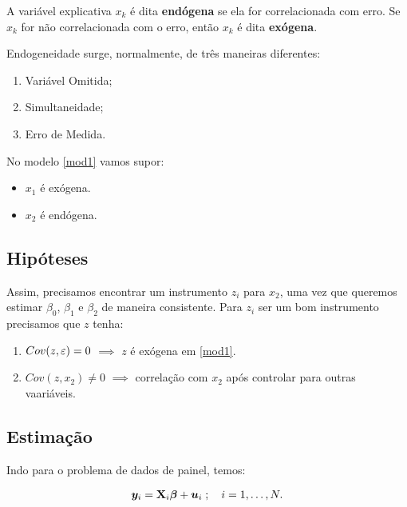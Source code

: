 \documentclass[11pt, oneside, a4paper, article]{article}
\numberwithin{equation}{section}
\begin{document}
\begin{description}
\noindent
A variável explicativa $x_{k}$ é dita \textbf{endógena} se ela for correlacionada com erro.
Se $x_{k}$ for não correlacionada com o erro, então $x_{k}$ é dita \textbf{exógena}.

Endogeneidade surge, normalmente, de três maneiras diferentes:

\begin{enumerate}\itemsep0pt
	\item Variável Omitida;
	\item Simultaneidade;
	\item Erro de Medida.
\end{enumerate}

No modelo \eqref{mod1} vamos supor:

\begin{itemize}\itemsep0pt
	\item $x_{1}$ é exógena.
	\item $x_{2}$ é endógena.
\end{itemize}

\subsection{Hipóteses}

Assim, precisamos encontrar um instrumento $z_{i}$ para $x_{2}$, uma vez que queremos estimar $\beta_{0}$, $\beta_{1}$ e $\beta_{2}$ de maneira consistente.
Para $z_{i}$ ser um bom instrumento precisamos que $z$ tenha:

\begin{enumerate}\itemsep0pt
\item $Cov(z, \varepsilon) = 0$ $\implies$  $z$ é exógena em \eqref{mod1}.
\item $Cov(z, x_{2}) \neq 0$ $\implies$  correlação com $x_{2}$ após controlar para outras vaariáveis.
\end{enumerate}

\subsection{Estimação}

Indo para o problema de dados de painel, temos:

\vspace{-1 em}
\begin{align} \label{mod2}
	\boldsymbol{y}_{i} = \mathbf{X}_{i} \boldsymbol{\beta} + \boldsymbol{u}_{i}
	\; ; \quad i = 1, \dots, N.
\end{align}


\end{description}
\end{document}
